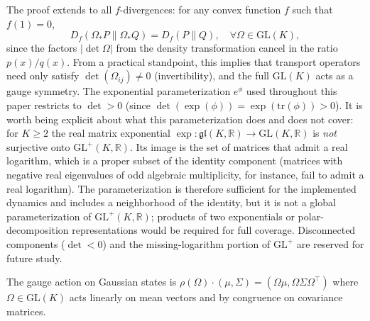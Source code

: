 \documentclass[11pt]{article}
\begin{document}
The proof extends to all $f$-divergences: for any convex function $f$ such that $f(1) = 0$,
\begin{equation}
D_f(\Omega_* P \| \Omega_* Q) = D_f(P \| Q), \quad \forall \Omega \in \mathrm{GL}(K),
\end{equation}
since the factors $|\det\Omega|$ from the density transformation cancel in the ratio $p(x)/q(x)$. From a practical standpoint, this implies that transport operators need only satisfy $\det(\Omega_{ij}) \neq 0$ (invertibility), and the full $\mathrm{GL}(K)$ acts as a gauge symmetry. The exponential parameterization $e^{\phi}$ used throughout this paper restricts to $\det > 0$ (since $\det(\exp(\phi)) = \exp(\mathrm{tr}(\phi)) > 0$). It is worth being explicit about what this parameterization does and does not cover: for $K \ge 2$ the real matrix exponential $\exp: \mathfrak{gl}(K, \mathbb{R}) \to \mathrm{GL}(K, \mathbb{R})$ is \emph{not} surjective onto $\mathrm{GL}^+(K, \mathbb{R})$. Its image is the set of matrices that admit a real logarithm, which is a proper subset of the identity component (matrices with negative real eigenvalues of odd algebraic multiplicity, for instance, fail to admit a real logarithm). The parameterization is therefore sufficient for the implemented dynamics and includes a neighborhood of the identity, but it is not a global parameterization of $\mathrm{GL}^+(K, \mathbb{R})$; products of two exponentials or polar-decomposition representations would be required for full coverage. Disconnected components ($\det < 0$) and the missing-logarithm portion of $\mathrm{GL}^+$ are reserved for future study.

The gauge action on Gaussian states is $\rho(\Omega) \cdot (\mu, \Sigma) = (\Omega\mu, \Omega\Sigma\Omega^\top)$ where $\Omega \in \mathrm{GL}(K)$ acts linearly on mean vectors and by congruence on covariance matrices.
\end{document}

